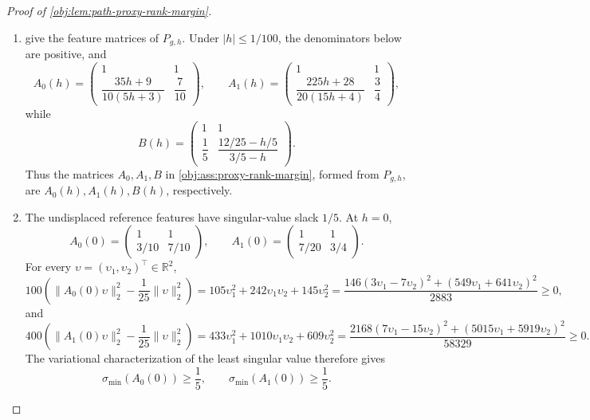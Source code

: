 \documentclass[11pt]{article}
\begin{document}
\begin{proof}[Proof of \cref{obj:lem:path-proxy-rank-margin}]
\begin{enumerate}
\item {} give the feature matrices of \(P_{g,h}\). Under \(|h|\le 1/100\), the denominators below are positive, and
\[
A_0(h)=
\begin{pmatrix}
1&1\\[0.2em]
\dfrac{35h+9}{10(5h+3)}&\dfrac{7}{10}
\end{pmatrix},
\qquad
A_1(h)=
\begin{pmatrix}
1&1\\[0.2em]
\dfrac{225h+28}{20(15h+4)}&\dfrac{3}{4}
\end{pmatrix},
\]
while
\[
B(h)=
\begin{pmatrix}
1&1\\[0.2em]
\dfrac15&\dfrac{12/25-h/5}{3/5-h}
\end{pmatrix}.
\]
Thus the matrices \(A_0,A_1,B\) in \cref{obj:ass:proxy-rank-margin}, formed from \(P_{g,h}\), are \(A_0(h),A_1(h),B(h)\), respectively. %

\item The undisplaced reference features have singular-value slack \(1/5\). At \(h=0\),
\[
A_0(0)=
\begin{pmatrix}1&1\\[0.2em]3/10&7/10\end{pmatrix},
\qquad
A_1(0)=
\begin{pmatrix}1&1\\[0.2em]7/20&3/4\end{pmatrix}.
\]
For every \(\upsilon=(\upsilon_1,\upsilon_2)^\top\in\mathbb R^2\),
\[
100\left(\|A_0(0)\upsilon\|_2^2-\frac1{25}\|\upsilon\|_2^2\right)
=
105\upsilon_1^2+242\upsilon_1\upsilon_2+145\upsilon_2^2
=
\frac{146(3\upsilon_1-7\upsilon_2)^2+(549\upsilon_1+641\upsilon_2)^2}{2883}\ge0,
\]
and
\[
400\left(\|A_1(0)\upsilon\|_2^2-\frac1{25}\|\upsilon\|_2^2\right)
=
433\upsilon_1^2+1010\upsilon_1\upsilon_2+609\upsilon_2^2
=
\frac{2168(7\upsilon_1-15\upsilon_2)^2+(5015\upsilon_1+5919\upsilon_2)^2}{58329}\ge0.
\]
The variational characterization of the least singular value therefore gives
\[
\sigma_{\min}(A_0(0))\ge\frac15,
\qquad
\sigma_{\min}(A_1(0))\ge\frac15 .
\] %


\end{enumerate}
\end{proof}
\end{document}
